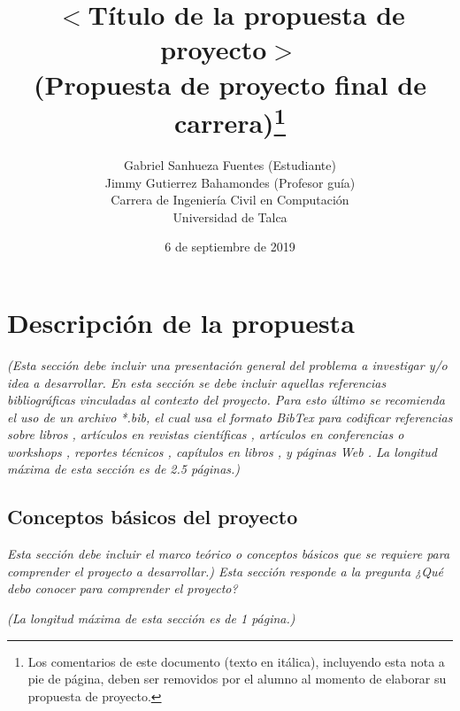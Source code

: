 \documentclass[11pt,letterpaper]{article}
\begin{document}
\pagestyle{empty}

\title{
$<$Título de la propuesta de proyecto$>$\\
(Propuesta de proyecto final de carrera)\footnote{Los comentarios de este documento (texto en itálica), incluyendo esta nota a pie de página, deben ser removidos por el alumno al momento de elaborar su propuesta de proyecto.}}
\author{
Gabriel Sanhueza Fuentes (Estudiante)\\
Jimmy Gutierrez Bahamondes (Profesor guía)\\
Carrera de Ingeniería Civil en Computación\\ 
Universidad de Talca}
\date{6 de septiembre de 2019}

\maketitle


\section{Descripción de la propuesta}
\emph{(Esta sección debe incluir una presentación general del problema a investigar y/o idea a desarrollar. En esta sección se debe incluir aquellas referencias bibliográficas vinculadas al contexto del proyecto. Para esto último se recomienda el uso de un archivo *.bib, el cual usa el formato BibTex \cite{1} para codificar  referencias sobre libros \cite{2}, artículos en revistas científicas \cite{3}, artículos en conferencias o workshops \cite{4}, reportes técnicos \cite{5}, capítulos en libros \cite{6}, y páginas Web \cite{7}.
La longitud máxima de esta sección es de 2.5 páginas.)}

\subsection{Conceptos básicos del proyecto} 
\emph{Esta sección debe incluir el marco teórico o conceptos básicos que se requiere para comprender el proyecto a desarrollar.) Esta sección responde a la pregunta ¿Qué debo conocer para comprender el proyecto?}

\emph{(La longitud máxima de esta sección es de 1 página.)}
\end{document}
